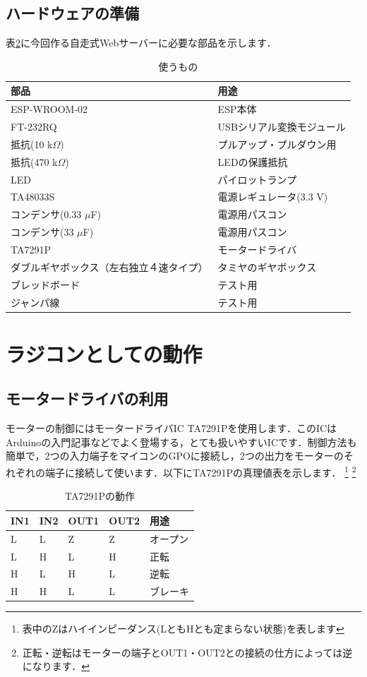 \subsection{ハードウェアの準備}
表\ref{buhin}に今回作る自走式Webサーバーに必要な部品を示します．
\begin{table}[htb]
\centering
\caption{使うもの}
\begin{tabular}{|l|l|} \hline
部品 & 用途 \\ \hline \hline
ESP-WROOM-02 & ESP本体  \\ \hline
FT-232RQ & USBシリアル変換モジュール  \\ \hline
抵抗(10 k$\Omega$) & プルアップ・プルダウン用  \\ \hline
抵抗(470 k$\Omega$) & LEDの保護抵抗 \\ \hline
LED & パイロットランプ  \\ \hline
TA48033S & 電源レギュレータ(3.3 V) \\ \hline
コンデンサ(0.33 $\mu$F) & 電源用パスコン  \\ \hline
コンデンサ(33 $\mu$F) & 電源用パスコン  \\ \hline
TA7291P & モータードライバ \\ \hline
ダブルギヤボックス（左右独立４速タイプ） & タミヤのギヤボックス  \\ \hline
ブレッドボード & テスト用 \\ \hline
ジャンパ線 & テスト用 \\ \hline
\end{tabular}
\label{buhin}
\end{table}

\section{ラジコンとしての動作}
\subsection{モータードライバの利用}
    モーターの制御にはモータードライバIC TA7291Pを使用します．このICはArduinoの入門記事などでよく登場する，とても扱いやすいICです．制御方法も簡単で，2つの入力端子をマイコンのGPOに接続し，2つの出力をモーターのそれぞれの端子に接続して使います．以下にTA7291Pの真理値表を示します．
\footnote{表中のZはハイインピーダンス(LともHとも定まらない状態)を表します}
\footnote{正転・逆転はモーターの端子とOUT1・OUT2との接続の仕方によっては逆になります．}

\begin{table}[H]
\centering
\caption{TA7291Pの動作}
\begin{tabular}{|l|l|l|l|l|} \hline
IN1 & IN2 & OUT1 & OUT2 & 用途 \\ \hline \hline
L & L & Z & Z & オープン \\ \hline
L & H & L & H & 正転 \\ \hline
H & L & H & L & 逆転 \\ \hline
H & H & L & L & ブレーキ \\ \hline
\end{tabular}
\label{buhin}
\end{table}

